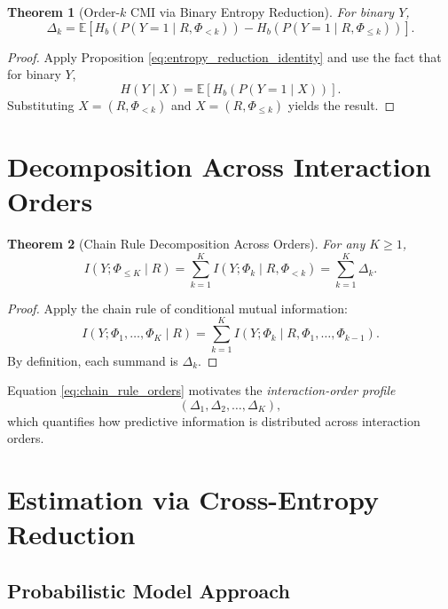 \documentclass[11pt]{article}
\newtheorem{theorem}{Theorem}
\newcommand{\E}{\mathbb{E}}
\newcommand{\1}{\mathbf{1}}
\begin{document}
\begin{theorem}[Order-$k$ CMI via Binary Entropy Reduction]
For binary $Y$,
\begin{equation}
\Delta_k
=
\E\!\left[
H_b\!\left( P(Y=1 \mid R,\Phi_{<k}) \right)
-
H_b\!\left( P(Y=1 \mid R,\Phi_{\le k}) \right)
\right].
\label{eq:binary_entropy_reduction}
\end{equation}
\end{theorem}

\begin{proof}
Apply Proposition \eqref{eq:entropy_reduction_identity} and use the fact that for binary $Y$,
\[
H(Y \mid X) = \E\left[ H_b\!\left( P(Y=1 \mid X) \right) \right].
\]
Substituting $X=(R,\Phi_{<k})$ and $X=(R,\Phi_{\le k})$ yields the result.
\end{proof}

\section{Decomposition Across Interaction Orders}

\begin{theorem}[Chain Rule Decomposition Across Orders]
For any $K \ge 1$,
\begin{equation}
I(Y;\Phi_{\le K}\mid R)
=
\sum_{k=1}^K I(Y;\Phi_k \mid R,\Phi_{<k})
=
\sum_{k=1}^K \Delta_k.
\label{eq:chain_rule_orders}
\end{equation}
\end{theorem}

\begin{proof}
Apply the chain rule of conditional mutual information:
\[
I(Y;\Phi_1,\ldots,\Phi_K \mid R)
=
\sum_{k=1}^K I(Y;\Phi_k \mid R,\Phi_1,\ldots,\Phi_{k-1}).
\]
By definition, each summand is $\Delta_k$.
\end{proof}

Equation \eqref{eq:chain_rule_orders} motivates the \emph{interaction-order profile}
\[
(\Delta_1,\Delta_2,\ldots,\Delta_K),
\]
which quantifies how predictive information is distributed across interaction orders.

\section{Estimation via Cross-Entropy Reduction}

\subsection{Probabilistic Model Approach}
\end{document}
